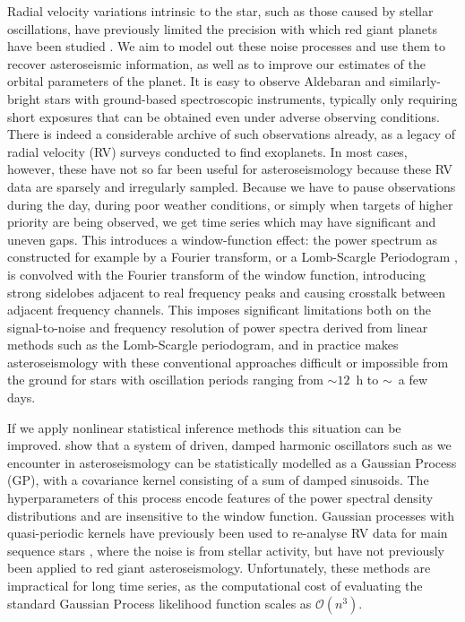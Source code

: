 \documentclass[modern]{aastex61}
\begin{document}
Radial velocity variations intrinsic to the star, such as those caused by stellar oscillations, have previously limited the precision with which red giant planets have been studied \citep{2005PASJ...57...97S}. We aim to model out these noise processes and use them to recover asteroseismic information, as well as to improve our estimates of the orbital parameters of the planet. It is easy to observe Aldebaran and similarly-bright stars with ground-based spectroscopic instruments, typically only requiring short exposures that can be obtained even under adverse observing conditions. There is indeed a considerable archive of such observations already, as a legacy of radial velocity (RV) surveys conducted to find exoplanets. In most cases, however, these have not so far been useful for asteroseismology because these RV data are sparsely and irregularly sampled. Because we have to pause observations during the day, during poor weather conditions, or simply when targets of higher priority are being observed, we get time series which may have significant and uneven gaps. This introduces a window-function effect: the power spectrum as constructed for example by a Fourier transform, or a Lomb-Scargle Periodogram \citep{lomb,scargle}, is convolved with the Fourier transform of the window function, introducing strong sidelobes adjacent to real frequency peaks and causing crosstalk between adjacent frequency channels. This imposes significant limitations both on the signal-to-noise and frequency resolution of power spectra derived from linear methods such as the Lomb-Scargle periodogram, and in practice makes asteroseismology with these conventional approaches difficult or impossible from the ground for stars with oscillation periods ranging from $\sim 12$~h to $\sim$~a few days.

If we apply nonlinear statistical inference methods this situation can be
improved. \citet{brewer2009} show that a system of driven, damped harmonic
oscillators such as we encounter in asteroseismology can be statistically
modelled as a Gaussian Process (GP), with a covariance kernel consisting of a sum of
damped sinusoids. The hyperparameters of this process encode features of the
power spectral density distributions and are insensitive to the window function. Gaussian processes with quasi-periodic kernels have previously been used to re-analyse RV data for main sequence stars \citep{2014MNRAS.443.2517H,2015MNRAS.452.2269R}, where the noise is from stellar activity, but have not previously been applied to red giant asteroseismology.
Unfortunately, these methods are impractical for long time series, as the computational
cost of evaluating the standard Gaussian Process likelihood function scales as
$\mathcal{O}(n^3)$.
\end{document}
